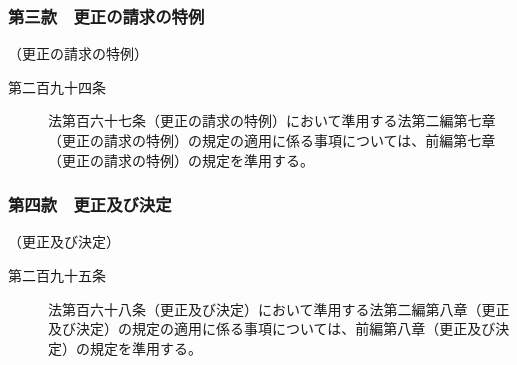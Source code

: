 \documentclass[twocolumn,a4j,10pt]{ltjtarticle}
\begin{document}
\subsubsection*{第三款　更正の請求の特例}
\noindent\hspace{10pt}（更正の請求の特例）
\begin{description}
\item[第二百九十四条]法第百六十七条（更正の請求の特例）において準用する法第二編第七章（更正の請求の特例）の規定の適用に係る事項については、前編第七章（更正の請求の特例）の規定を準用する。
\end{description}
\subsubsection*{第四款　更正及び決定}
\noindent\hspace{10pt}（更正及び決定）
\begin{description}
\item[第二百九十五条]法第百六十八条（更正及び決定）において準用する法第二編第八章（更正及び決定）の規定の適用に係る事項については、前編第八章（更正及び決定）の規定を準用する。
\end{description}
\end{document}
